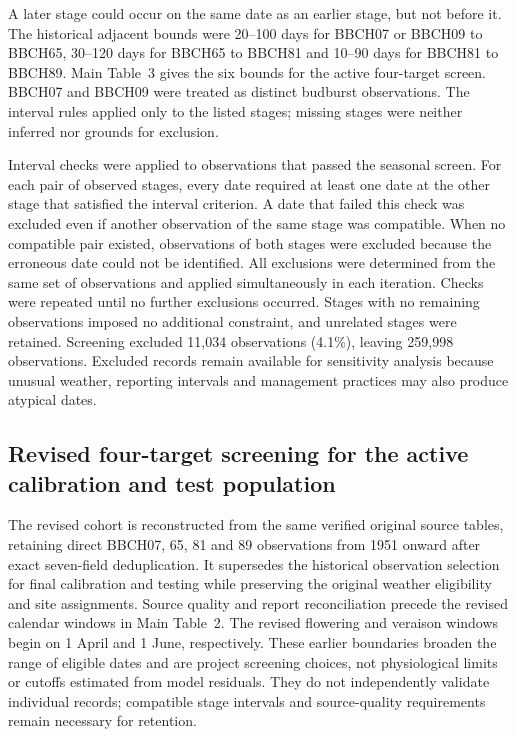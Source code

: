 \documentclass[a4paper,11pt]{article}
\let\OriginalSubsection\subsection
\renewcommand{\subsection}{\FloatBarrier\OriginalSubsection}
\begin{document}
A later stage could occur on the same date as an earlier stage, but not before it. The historical adjacent bounds were 20--100 days for BBCH07 or BBCH09 to BBCH65, 30--120 days for BBCH65 to BBCH81 and 10--90 days for BBCH81 to BBCH89. Main Table~3 gives the six bounds for the active four-target screen. BBCH07 and BBCH09 were treated as distinct budburst observations. The interval rules applied only to the listed stages; missing stages were neither inferred nor grounds for exclusion.



Interval checks were applied to observations that passed the seasonal screen. For each pair of observed stages, every date required at least one date at the other stage that satisfied the interval criterion. A date that failed this check was excluded even if another observation of the same stage was compatible. When no compatible pair existed, observations of both stages were excluded because the erroneous date could not be identified. All exclusions were determined from the same set of observations and applied simultaneously in each iteration. Checks were repeated until no further exclusions occurred. Stages with no remaining observations imposed no additional constraint, and unrelated stages were retained. Screening excluded 11,034 observations (4.1\%), leaving 259,998 observations. Excluded records remain available for sensitivity analysis because unusual weather, reporting intervals and management practices may also produce atypical dates.



\subsection*{Revised four-target screening for the active calibration and test population}
The revised cohort is reconstructed from the same verified original source tables, retaining direct BBCH07, 65, 81 and 89 observations from 1951 onward after exact seven-field deduplication. It supersedes the historical observation selection for final calibration and testing while preserving the original weather eligibility and site assignments. Source quality and report reconciliation precede the revised calendar windows in Main Table~2. The revised flowering and veraison windows begin on 1 April and 1 June, respectively. These earlier boundaries broaden the range of eligible dates and are project screening choices, not physiological limits or cutoffs estimated from model residuals. They do not independently validate individual records; compatible stage intervals and source-quality requirements remain necessary for retention.
\end{document}
